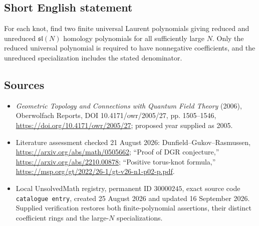 \documentclass[11pt]{article}
\begin{document}
\subsection{Short English statement}
For each knot, find two finite universal Laurent polynomials giving reduced and unreduced $\mathfrak{sl}(N)$ homology polynomials for all sufficiently large $N$. Only the reduced universal polynomial is required to have nonnegative coefficients, and the unreduced specialization includes the stated denominator.
\subsection{Sources}
\begin{itemize}
\item \emph{Geometric Topology and Connections with Quantum Field Theory} (2006), Oberwolfach Reports, DOI 10.4171/owr/2005/27, pp. 1505--1546, \url{https://doi.org/10.4171/owr/2005/27}; proposed year supplied as 2005.
\item Literature assessment checked 21 August 2026: Dunfield--Gukov--Rasmussen, \url{https://arxiv.org/abs/math/0505662}; ``Proof of DGR conjecture,'' \url{https://arxiv.org/abs/2210.00878}; ``Positive torus-knot formula,'' \url{https://msp.org/gt/2022/26-1/gt-v26-n1-p02-p.pdf}.
\item Local UnsolvedMath registry, permanent ID $30000245$, exact source code \texttt{catalogue entry}, created 25 August 2026 and updated 16 September 2026. Supplied verification restores both finite-polynomial assertions, their distinct coefficient rings and the large-$N$ specializations.
\end{itemize}
\end{document}
